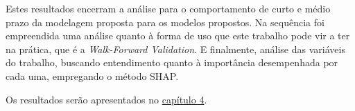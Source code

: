 Estes resultados encerram a análise para o comportamento de curto e médio prazo da modelagem proposta para os modelos propostos. Na sequência foi empreendida uma análise quanto à forma de uso que este trabalho pode vir a ter na prática, que é a \textit{Walk-Forward Validation}. E finalmente, análise das variáveis do trabalho, buscando entendimento quanto à importância desempenhada por cada uma, empregando o método SHAP.



Os resultados serão apresentados no \hyperref[cap:capitulo4]{capítulo 4}.
\clearpage


